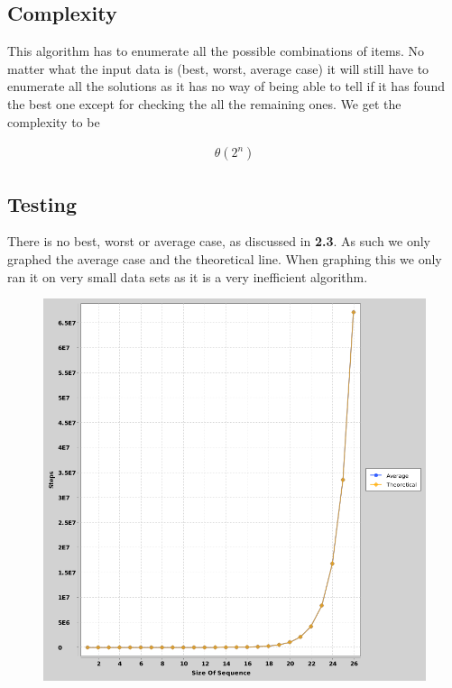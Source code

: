 \documentclass{article}
\begin{document}
		\subsection{Complexity}
			This algorithm has to enumerate all the possible combinations of items. No matter what the input data is (best, worst, average case) it will still have to enumerate all the solutions as it has no way of being able to tell if it has found the best one except for checking the all the remaining ones. We get the complexity to be 
			
			\begin{align}
				\theta(2^n)
			\end{align}
			
		\subsection{Testing}
			There is no best, worst or average case, as discussed in \textbf{2.3}. As such we only graphed the average case and the theoretical line. When graphing this we only ran it on very small data sets as it is a very inefficient algorithm.
			
			\begin{figure}[h]
				\vspace{3mm}
				\begin{center}
					\includegraphics[scale=0.4]{BruteForce.png}
				\end{center}
			\end{figure}
			
\end{document}
